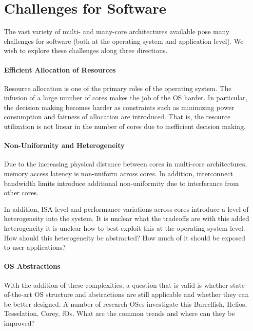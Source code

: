 \section{Challenges for Software}
\label{sec:challenges}

The vast variety of multi- and many-core architectures available pose many challenges for
software (both at the operating system and application level). We wish to explore these
challenges along three directions.

\paragraph{Efficient Allocation of Resources}

Resource allocation is one of the primary roles of the operating system. The infusion of a
large number of cores makes the job of the OS harder. In particular, the decision making
becomes harder as constraints such as minimizing power consumption and fairness of allocation
are introduced. That is, the resource utilization is not linear in the number of cores due to
inefficient decision making.

\paragraph{Non-Uniformity and Heterogeneity}

Due to the increasing physical distance between cores in multi-core architectures, memory
access latency is non-uniform across cores. In addition, interconnect bandwidth limits
introduce additional non-uniformity due to interferance from other cores.

In addition, ISA-level and performance variations across cores introduce a level of
heterogeneity into the system. It is unclear what the tradeoffs are with this added
heterogeneity it is unclear how to best exploit this at the operating system level. How
should this heterogeneity be abstracted? How much of it should be exposed to user
applications?

\paragraph{OS Abstractions}

With the addition of these complexities, a question that is valid is whether state-of-the-art
OS structure and abstractions are still applicable and whether they can be better designed.
A number of research OSes investigate this Barrelfish, Helios, Tesselation, Corey, fOs.
What are the common trends and where can they be improved?

